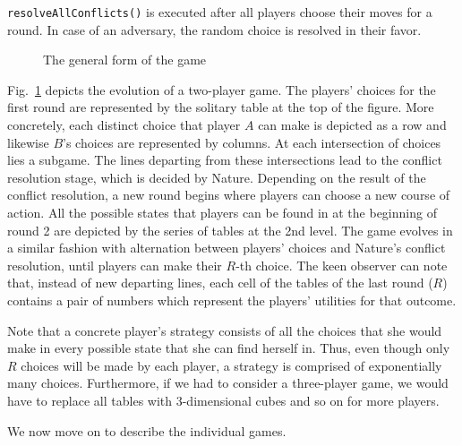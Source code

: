   \noindent \texttt{resolveAllConflicts()} is executed after all players choose their moves for a round. In case of an
  adversary, the random choice is resolved in their favor.
  
  \begin{figure}[p]
  \label{fig:game}
    \centering
    \caption{The general form of the game \cite{sgtm}}
  \end{figure}
  
  Fig.~\ref{fig:game} depicts the evolution of a two-player game. The players' choices for the first round are represented by
  the solitary table at the top of the figure. More concretely, each distinct choice that player $A$ can make is depicted as a
  row and likewise $B$'s choices are represented by columns. At each intersection of choices lies a subgame. The lines
  departing from these intersections lead to the conflict resolution stage, which is decided by Nature. Depending on the
  result of the conflict resolution, a new round begins where players can choose a new course of action. All the possible
  states that players can be found in at the beginning of round 2 are depicted by the series of tables at the 2nd level. The
  game evolves in a similar fashion with alternation between players' choices and Nature's conflict resolution, until players
  can make their $R$-th choice. The keen observer can note that, instead of new departing lines, each cell of the tables of
  the last round ($R$) contains a pair of numbers which represent the players' utilities for that outcome.
  
  Note that a concrete player's strategy consists of all the choices that she would make in every possible state that she can
  find herself in. Thus, even though only $R$ choices will be made by each player, a strategy is comprised of exponentially
  many choices. Furthermore, if we had to consider a three-player game, we would have to replace all tables with 3-dimensional
  cubes and so on for more players.

  We now move on to describe the individual games.
